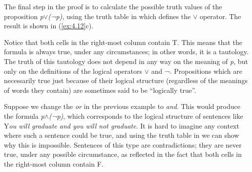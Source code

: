 \largerpage
The final step in the proof is to calculate the possible truth values of the proposition \textit{p$\vee$}\textit{(¬}\textit{p)}, using the truth table in  which defines the \textit{$\vee$} operator. The result is shown in (\ref{ex:4.12}c). 


\setcounter{equation}{11}

Notice that both cells in the right-most column contain T. This means that the formula is always true, under any circumstances; in other words, it is a tautology. The truth of this tautology does not depend in any way on the meaning of \textit{p}, but only on the definitions of the logical operators $\vee$ and ¬. Propositions which are necessarily true just because of their logical structure (regardless of the meanings of words they contain) are sometimes said to be “logically true”.



Suppose we change the \textit{or} in the previous example to \textit{and}. This would produce the formula \textit{p$\wedge$}\textit{(¬}\textit{p)}, which corresponds to the logical structure of sentences like Y\textit{ou will graduate and you will not graduate}. It is hard to imagine any context where such a sentence could be true, and using the truth table in  we can show why this is impossible. Sentences of this type are contradictions; they are never true, under any possible circumstance, as reflected in the fact that both cells in the right-most column contain F.




